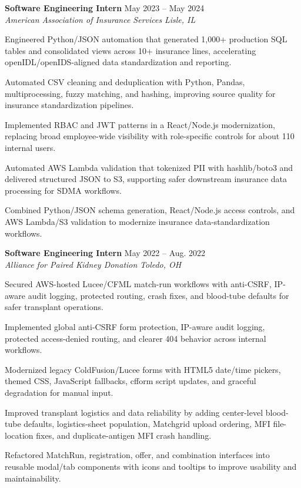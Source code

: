 \documentclass[letterpaper,10pt]{article}
\newcommand{\resumeSubheading}[4]{
  \vspace{2pt}
  \textbf{#1} \hfill #2\\
  \textit{#3} \hfill \textit{#4}
}
\begin{document}
\resumeSubheading
{Software Engineering Intern}{May 2023 -- May 2024}
{American Association of Insurance Services}{Lisle, IL}
\begin{tightitemize}
  \item Engineered Python/JSON automation that generated 1,000+ production SQL tables and consolidated views across 10+ insurance lines, accelerating openIDL/openIDS-aligned data standardization and reporting.
  \item Automated CSV cleaning and deduplication with Python, Pandas, multiprocessing, fuzzy matching, and hashing, improving source quality for insurance standardization pipelines.
  \item Implemented RBAC and JWT patterns in a React/Node.js modernization, replacing broad employee-wide visibility with role-specific controls for about 110 internal users.
  \item Automated AWS Lambda validation that tokenized PII with hashlib/boto3 and delivered structured JSON to S3, supporting safer downstream insurance data processing for SDMA workflows.
  \item Combined Python/JSON schema generation, React/Node.js access controls, and AWS Lambda/S3 validation to modernize insurance data-standardization workflows.
\end{tightitemize}

\resumeSubheading
{Software Engineering Intern}{May 2022 -- Aug. 2022}
{Alliance for Paired Kidney Donation}{Toledo, OH}
\begin{tightitemize}
  \item Secured AWS-hosted Lucee/CFML match-run workflows with anti-CSRF, IP-aware audit logging, protected routing, crash fixes, and blood-tube defaults for safer transplant operations.
  \item Implemented global anti-CSRF form protection, IP-aware audit logging, protected access-denied routing, and clearer 404 behavior across internal workflows.
  \item Modernized legacy ColdFusion/Lucee forms with HTML5 date/time pickers, themed CSS, JavaScript fallbacks, cfform script updates, and graceful degradation for manual input.
  \item Improved transplant logistics and data reliability by adding center-level blood-tube defaults, logistics-sheet population, Matchgrid upload ordering, MFI file-location fixes, and duplicate-antigen MFI crash handling.
  \item Refactored MatchRun, registration, offer, and combination interfaces into reusable modal/tab components with icons and tooltips to improve usability and maintainability.
\end{tightitemize}
\end{document}
